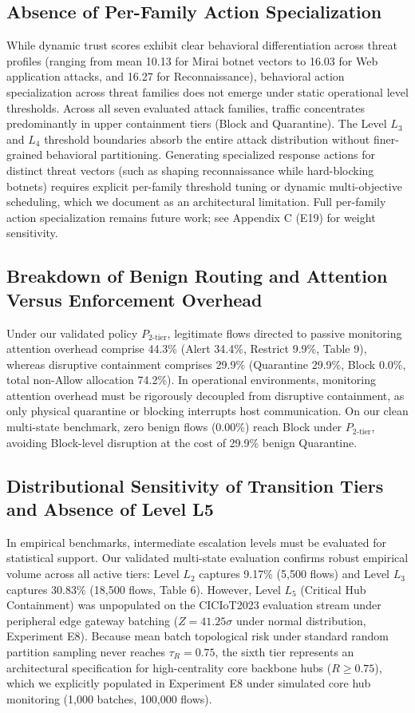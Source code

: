 \documentclass[journal,10pt,onecolumn]{IEEEtran}
\begin{document}
\subsection{Absence of Per-Family Action Specialization}
While dynamic trust scores exhibit clear behavioral differentiation across threat profiles (ranging from mean 10.13 for Mirai botnet vectors to 16.03 for Web application attacks, and 16.27 for Reconnaissance), behavioral action specialization across threat families does not emerge under static operational level thresholds. Across all seven evaluated attack families, traffic concentrates predominantly in upper containment tiers (Block and Quarantine). The Level $L_3$ and $L_4$ threshold boundaries absorb the entire attack distribution without finer-grained behavioral partitioning. Generating specialized response actions for distinct threat vectors (such as shaping reconnaissance while hard-blocking botnets) requires explicit per-family threshold tuning or dynamic multi-objective scheduling, which we document as an architectural limitation. Full per-family action specialization remains future work; see Appendix C (E19) for weight sensitivity.


\subsection{Breakdown of Benign Routing and Attention Versus Enforcement Overhead}
Under our validated policy $P_{2\text{-tier}}$, legitimate flows directed to passive monitoring attention overhead comprise 44.3\% (Alert 34.4\%, Restrict 9.9\%, Table 9), whereas disruptive containment comprises 29.9\% (Quarantine 29.9\%, Block 0.0\%, total non-Allow allocation 74.2\%). In operational environments, monitoring attention overhead must be rigorously decoupled from disruptive containment, as only physical quarantine or blocking interrupts host communication. On our clean multi-state benchmark, zero benign flows (0.00\%) reach Block under $P_{2\text{-tier}}$, avoiding Block-level disruption at the cost of 29.9\% benign Quarantine.


\subsection{Distributional Sensitivity of Transition Tiers and Absence of Level L5}
In empirical benchmarks, intermediate escalation levels must be evaluated for statistical support. Our validated multi-state evaluation confirms robust empirical volume across all active tiers: Level $L_2$ captures 9.17\% (5,500 flows) and Level $L_3$ captures 30.83\% (18,500 flows, Table 6). However, Level $L_5$ (Critical Hub Containment) was unpopulated on the CICIoT2023 evaluation stream under peripheral edge gateway batching ($Z = 41.25\sigma$ under normal distribution, Experiment E8). Because mean batch topological risk under standard random partition sampling never reaches $\tau_R = 0.75$, the sixth tier represents an architectural specification for high-centrality core backbone hubs ($R \ge 0.75$), which we explicitly populated in Experiment E8 under simulated core hub monitoring (1,000 batches, 100,000 flows).
\end{document}
